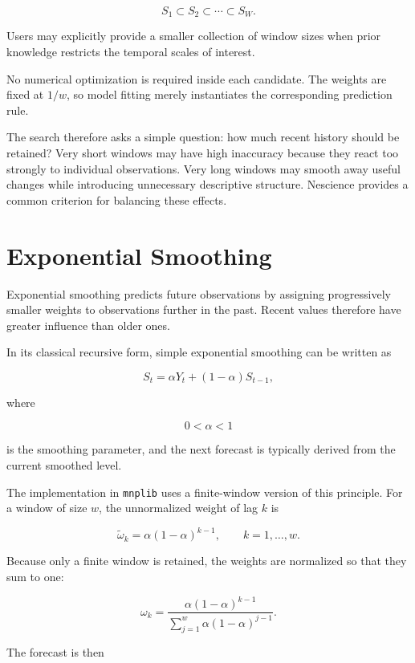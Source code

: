 \[
S_1
\subset
S_2
\subset
\cdots
\subset
S_W.
\]

Users may explicitly provide a smaller collection of window sizes when prior
knowledge restricts the temporal scales of interest.

No numerical optimization is required inside each candidate. The weights are
fixed at \(1/w\), so model fitting merely instantiates the corresponding
prediction rule.

The search therefore asks a simple question: how much recent history should be
retained? Very short windows may have high inaccuracy because they react too
strongly to individual observations. Very long windows may smooth away useful
changes while introducing unnecessary descriptive structure. Nescience provides
a common criterion for balancing these effects.


%
%

\section{Exponential Smoothing}
\label{subsec:automl_exponential_smoothing}

Exponential smoothing predicts future observations by assigning progressively
smaller weights to observations further in the past. Recent values therefore have
greater influence than older ones.

In its classical recursive form, simple exponential smoothing can be written as

\[
S_t
=
\alpha Y_t
+
(1-\alpha)S_{t-1},
\]

where

\[
0<\alpha<1
\]

is the smoothing parameter, and the next forecast is typically derived from the
current smoothed level.

The implementation in \texttt{mnplib} uses a finite-window version of this
principle. For a window of size \(w\), the unnormalized weight of lag \(k\) is

\[
\widetilde\omega_k
=
\alpha(1-\alpha)^{k-1},
\qquad
k=1,\ldots,w.
\]

Because only a finite window is retained, the weights are normalized so that
they sum to one:

\[
\omega_k
=
\frac{
\alpha(1-\alpha)^{k-1}
}{
\sum_{j=1}^{w}
\alpha(1-\alpha)^{j-1}
}.
\]

The forecast is then

